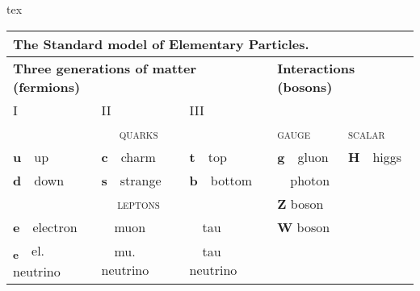 \documentclass[
	raggedright,
	12pt,
	colorful,
]{tufte-style-article}
\begin{document}
\begin{codebox}{tex}
\begin{table}[!htb]\small
	\begin{tabular}{lllll}
		\multicolumn{5}{l}{\textbf{The Standard model of Elementary Particles.}}\\
		\toprule
		\multicolumn{3}{l}{\textbf{Three generations of matter (fermions)}} & \multicolumn{2}{l}{\textbf{Interactions (bosons)}} \\
		I & II & III & & \\
		\multicolumn{3}{c}{\textsc{quarks}} & \textsc{gauge} & \textsc{scalar} \\
		\cmidrule(lr){1-3}\cmidrule(lr){4-4}\cmidrule(lr){5-5}
		\textbf{u}~~up & \textbf{c}~~charm & \textbf{t}~~top & \textbf{g}~~gluon & \textbf{H}~~higgs \\
		\textbf{d}~~down & \textbf{s}~~strange & \textbf{b}~~bottom & \textbf{\textgamma}~~photon & \\
		\multicolumn{3}{c}{\textsc{leptons}} & \textbf{Z} boson  & \\
		\cmidrule(lr){1-3}
		\textbf{e}~~electron & \textbf{\textmu}~~muon & \textbf{\texttau}~~tau & \textbf{W} boson & \\
		\textbf{\textnu\textsubscript{e}}~~el. neutrino & \textbf{\textnu\textsubscript{\textmu}}~~mu. neutrino & \textbf{\textnu\textsubscript{\texttau}}~~tau neutrino &  & \\
		\bottomrule
	\end{tabular}
\end{table}
\end{codebox}
\end{document}
